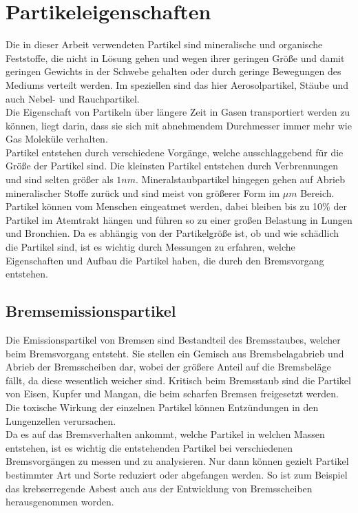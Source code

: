 \section{Partikeleigenschaften}
Die in dieser Arbeit verwendeten Partikel sind mineralische und organische Feststoffe, die nicht in L\"{o}sung gehen und wegen ihrer geringen Gr\"{o}{\ss}e und damit geringen Gewichts in der Schwebe gehalten oder durch geringe Bewegungen des Mediums verteilt werden. Im speziellen sind das hier Aerosolpartikel, St\"{a}ube und auch Nebel- und Rauchpartikel.\\
Die Eigenschaft von Partikeln \"{u}ber l\"{a}ngere Zeit in Gasen transportiert werden zu k\"{o}nnen, liegt darin, dass sie sich mit abnehmendem Durchmesser immer mehr wie Gas Molek\"{u}le verhalten.\\
Partikel entstehen durch verschiedene Vorg\"{a}nge, welche ausschlaggebend f\"{u}r die Gr\"{o}{\ss}e der Partikel sind. Die kleinsten Partikel entstehen durch Verbrennungen und sind selten gr\"{o}{\ss}er als \(1 nm\). Mineralstaubpartikel hingegen gehen auf Abrieb mineralischer Stoffe zur\"{u}ck und sind meist von gr\"{o}{\ss}erer Form im \(\mu m\) Bereich.\\
Partikel k\"{o}nnen vom Menschen eingeatmet werden, dabei bleiben bis zu 10\% der Partikel im Atemtrakt h\"{a}ngen und f\"{u}hren so zu einer gro{\ss}en Belastung in Lungen und Bronchien. Da es abh\"{a}ngig von der Partikelgr\"{o}{\ss}e ist, ob und wie sch\"{a}dlich die Partikel sind, ist es wichtig durch Messungen zu erfahren, welche Eigenschaften und Aufbau die Partikel haben, die durch den Bremsvorgang entstehen\cite{reinraumtechnik}.

\subsection{Bremsemissionspartikel}
Die Emissionspartikel von Bremsen  sind Bestandteil des Bremsstaubes, welcher beim Bremsvorgang entsteht. Sie stellen ein Gemisch aus Bremsbelagabrieb und Abrieb der Bremsscheiben dar, wobei der gr\"{o}{\ss}ere Anteil auf die Bremsbel\"{a}ge f\"{a}llt, da diese wesentlich weicher sind. Kritisch beim Bremsstaub sind die Partikel von Eisen, Kupfer und Mangan, die beim scharfen Bremsen freigesetzt werden. Die toxische Wirkung der einzelnen Partikel k\"{o}nnen Entz\"{u}ndungen in den Lungenzellen verursachen.\\
Da es auf das Bremsverhalten ankommt, welche Partikel in welchen Massen entstehen, ist es wichtig die entstehenden Partikel bei verschiedenen Bremsvorg\"{a}ngen zu messen und zu analysieren. Nur dann k\"{o}nnen gezielt Partikel bestimmter Art und Sorte reduziert oder abgefangen werden. So ist zum Beispiel das krebserregende Asbest auch aus der Entwicklung von Bremsscheiben herausgenommen worden\cite{envyl}.

